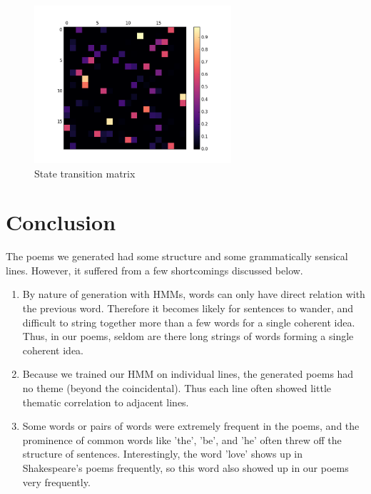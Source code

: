 \begin{figure}[H]
	\centering
	\includegraphics[width=0.65\textwidth, clip=true, trim=1cm 1cm 1cm 1cm]{transition_matrix}
	\caption{State transition matrix}\label{fig:state-transition}
\end{figure}

\section{Conclusion}

The poems we generated had some structure and some grammatically sensical lines. However, it suffered from a few shortcomings discussed below.

\begin{enumerate}

\item By nature of generation with HMMs, words can only have direct relation with the previous word. Therefore it becomes likely for sentences to wander, and difficult to string together more than a few words for a single coherent idea. Thus, in our poems, seldom are there long strings of words forming a single coherent idea. 

\item Because we trained our HMM on individual lines, the generated poems had no theme (beyond the coincidental). Thus each line often showed little thematic correlation to adjacent lines.

\item Some words or pairs of words were extremely frequent in the poems, and the prominence of common words like 'the', 'be', and 'he' often threw off the structure of sentences. Interestingly, the word 'love' shows up in Shakespeare's poems frequently, so this word also showed up in our poems very frequently.

\end{enumerate}


